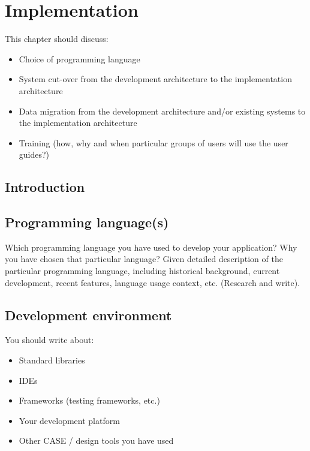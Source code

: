 \chapter{Implementation} %
\label{cha:implementation}
This chapter should discuss:
\begin{itemize}
  \item Choice of programming language
  \item System cut-over from the development architecture to the implementation architecture
  \item Data migration from the development architecture and/or existing systems to the implementation architecture
  \item Training (how, why and when particular groups of users will use the user guides?)
\end{itemize}

\section{Introduction} %


\section{Programming language(s)} %
\label{sec:programming_languages}
Which programming language you have used to develop your application?
Why you have chosen that particular language?
Given detailed description of the particular programming language, including historical background, current development, recent features, language usage context, etc. (Research and write).


\section{Development environment} %
\label{sec:development_environment}

You should write about:
\begin{itemize}
  \item Standard libraries
  \item IDEs
  \item Frameworks (testing frameworks, etc.)
  \item Your development platform
  \item Other CASE / design tools you have used
\end{itemize}

